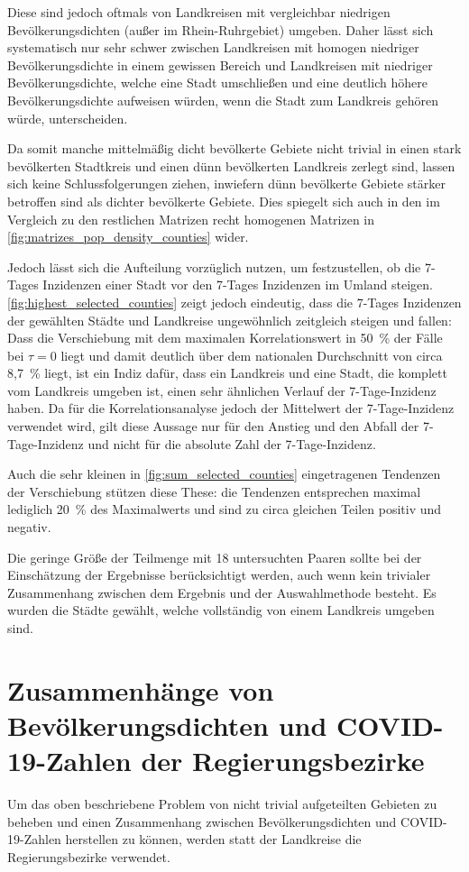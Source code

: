 Diese sind jedoch oftmals von Landkreisen mit vergleichbar niedrigen Bevölkerungsdichten (außer im Rhein-Ruhrgebiet) umgeben. Daher lässt sich systematisch nur sehr schwer zwischen Landkreisen mit homogen niedriger Bevölkerungsdichte in einem gewissen Bereich und Landkreisen mit niedriger Bevölkerungsdichte, welche eine Stadt umschließen und eine deutlich höhere Bevölkerungsdichte aufweisen würden, wenn die Stadt zum Landkreis gehören würde, unterscheiden.

Da somit manche mittelmäßig dicht bevölkerte Gebiete nicht trivial in einen stark bevölkerten Stadtkreis und einen dünn bevölkerten Landkreis zerlegt sind, lassen sich keine Schlussfolgerungen ziehen, inwiefern dünn bevölkerte Gebiete stärker betroffen sind als dichter bevölkerte Gebiete. Dies spiegelt sich auch in den im Vergleich zu den restlichen Matrizen recht homogenen Matrizen in \autoref{fig:matrizes_pop_density_counties} wider.

Jedoch lässt sich die Aufteilung vorzüglich nutzen, um festzustellen, ob die 7-Tages Inzidenzen einer Stadt vor den 7-Tages Inzidenzen im Umland steigen.
\autoref{fig:highest_selected_counties} zeigt jedoch eindeutig, dass die 7-Tages Inzidenzen der gewählten Städte und Landkreise ungewöhnlich zeitgleich steigen und fallen: Dass die Verschiebung mit dem maximalen Korrelationswert in 50~\% der Fälle bei $\tau=0$ liegt und damit deutlich über dem nationalen Durchschnitt von circa 8,7~\% liegt, ist ein Indiz dafür, dass ein Landkreis und eine Stadt, die komplett vom Landkreis umgeben ist, einen sehr ähnlichen Verlauf der 7-Tage-Inzidenz haben. Da für die Korrelationsanalyse jedoch der Mittelwert der 7-Tage-Inzidenz verwendet wird, gilt diese Aussage nur für den Anstieg und den Abfall der 7-Tage-Inzidenz und nicht für die absolute Zahl der 7-Tage-Inzidenz.

Auch die sehr kleinen in \autoref{fig:sum_selected_counties} eingetragenen Tendenzen der Verschiebung stützen diese These: die Tendenzen entsprechen maximal lediglich 20~\% des Maximalwerts und sind zu circa gleichen Teilen positiv und negativ.

Die geringe Größe der Teilmenge mit 18 untersuchten Paaren sollte bei der Einschätzung der Ergebnisse berücksichtigt werden, auch wenn kein trivialer Zusammenhang zwischen dem Ergebnis und der Auswahlmethode besteht. Es wurden die Städte gewählt, welche vollständig von einem Landkreis umgeben sind.

\section{Zusammenhänge von Bevölkerungsdichten und COVID-19-Zahlen der Regierungsbezirke}\label{sec:discussion:pop_density_districts}
Um das oben beschriebene Problem von nicht trivial aufgeteilten Gebieten zu beheben und einen Zusammenhang zwischen Bevölkerungsdichten und COVID-19-Zahlen herstellen zu können, werden statt der Landkreise die Regierungsbezirke verwendet.

